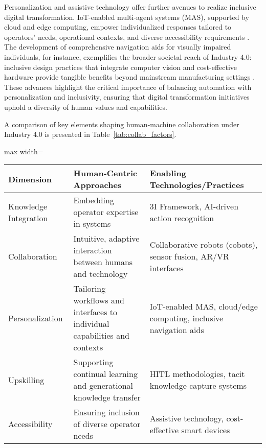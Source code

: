 \documentclass[sigconf]{acmart}
\begin{document}
Personalization and assistive technology offer further avenues to realize inclusive digital transformation. IoT-enabled multi-agent systems (MAS), supported by cloud and edge computing, empower individualized responses tailored to operators' needs, operational contexts, and diverse accessibility requirements \cite{ref54}. The development of comprehensive navigation aids for visually impaired individuals, for instance, exemplifies the broader societal reach of Industry 4.0: inclusive design practices that integrate computer vision and cost-effective hardware provide tangible benefits beyond mainstream manufacturing settings \cite{ref65}. These advances highlight the critical importance of balancing automation with personalization and inclusivity, ensuring that digital transformation initiatives uphold a diversity of human values and capabilities.

A comparison of key elements shaping human-machine collaboration under Industry 4.0 is presented in Table~\ref{tab:collab_factors}.

\begin{table*}[htbp]
\centering
\caption{Key Factors for Effective Human-Machine Collaboration in Industry 4.0}
\label{tab:collab_factors}
\begin{adjustbox}{max width=\textwidth}
\begin{tabular}{lll}
\toprule
\textbf{Dimension} & \textbf{Human-Centric Approaches} & \textbf{Enabling Technologies/Practices} \\
\midrule
Knowledge Integration & Embedding operator expertise in systems & 3I Framework, AI-driven action recognition \\
Collaboration & Intuitive, adaptive interaction between humans and technology & Collaborative robots (cobots), sensor fusion, AR/VR interfaces \\
Personalization & Tailoring workflows and interfaces to individual capabilities and contexts & IoT-enabled MAS, cloud/edge computing, inclusive navigation aids \\
Upskilling & Supporting continual learning and generational knowledge transfer & HITL methodologies, tacit knowledge capture systems \\
Accessibility & Ensuring inclusion of diverse operator needs & Assistive technology, cost-effective smart devices \\
\bottomrule
\end{tabular}
\end{adjustbox}
\end{table*}
\end{document}
